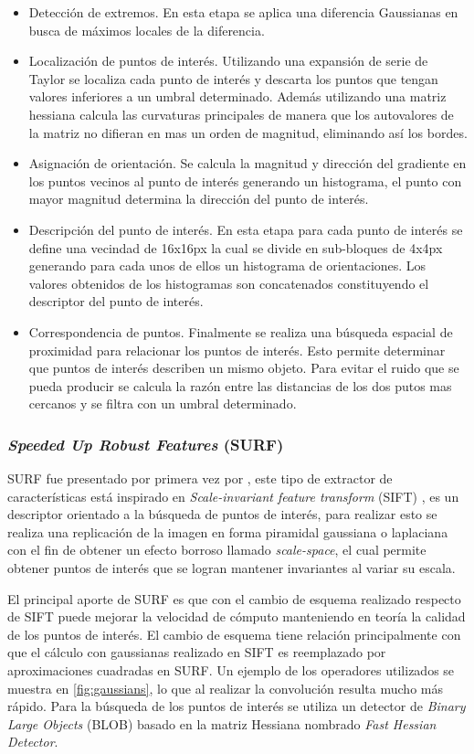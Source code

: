 \begin{itemize}
\item Detección de extremos. En esta etapa se aplica una diferencia Gaussianas en busca de máximos locales de la diferencia.
\item Localización de puntos de interés. Utilizando una expansión de serie de Taylor se localiza cada punto de interés y descarta los puntos que tengan valores inferiores a un umbral determinado. Además utilizando una matriz hessiana calcula las curvaturas principales de manera que los autovalores de la matriz no difieran en mas un orden de magnitud, eliminando así los bordes.
\item Asignación de orientación. Se calcula la magnitud y dirección del gradiente en los puntos vecinos al punto de interés generando un histograma, el punto con mayor magnitud determina la dirección del punto de interés.
\item Descripción del punto de interés. En esta etapa para cada punto de interés se define una vecindad de 16x16px la cual se divide en sub-bloques de 4x4px generando para cada unos de ellos un histograma de orientaciones. Los valores obtenidos de los histogramas son concatenados constituyendo el descriptor del punto de interés.
\item Correspondencia de puntos. Finalmente se realiza una búsqueda espacial de proximidad para relacionar los puntos de interés. Esto permite determinar que puntos de interés describen un mismo objeto. Para evitar el ruido que se pueda producir se calcula la razón entre las distancias de los dos putos mas cercanos y se filtra con un umbral determinado.
\end{itemize}

\subsubsection{\textit{Speeded Up Robust Features} (SURF)}

SURF fue presentado por primera vez por \cite{Bay2006}, este tipo de extractor de características está inspirado en \textit{Scale-invariant feature transform} (SIFT) \citep{Lowe2004}, es un descriptor orientado a la búsqueda de puntos de interés, para realizar esto se realiza una replicación de la imagen en forma piramidal gaussiana o laplaciana con el fin de obtener un efecto borroso llamado \textit{scale-space}, el cual permite obtener puntos de interés que se logran mantener invariantes al variar su escala. 

El principal aporte de SURF es que con el cambio de esquema realizado respecto de SIFT puede mejorar la velocidad de cómputo manteniendo en teoría la calidad de los puntos de interés. El cambio de esquema tiene relación principalmente con que el cálculo con gaussianas realizado en SIFT es reemplazado por aproximaciones cuadradas en SURF. Un ejemplo de los operadores utilizados se muestra en \ref{fig:gaussians}, lo que al realizar la convolución resulta mucho más rápido. Para la búsqueda de los puntos de interés se utiliza un detector de \textit{Binary Large Objects} (BLOB) basado en la matriz Hessiana nombrado \textit{Fast Hessian Detector}.

